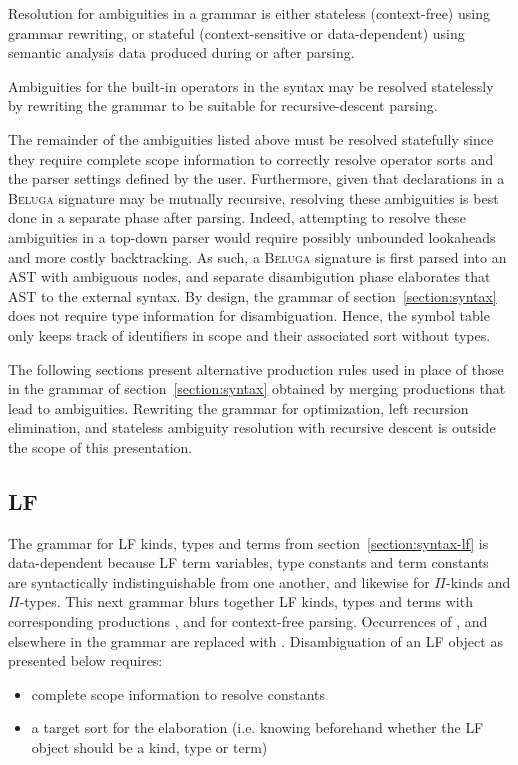 \documentclass[11pt]{article}
\newcommand{\Beluga}{\textsc{Beluga}\xspace}
\newcommand{\LF}{\textsc{LF}\xspace}
\begin{document}
Resolution for ambiguities in a grammar is either stateless (context-free) using grammar rewriting, or stateful (context-sensitive or data-dependent) using semantic analysis data produced during or after parsing.

Ambiguities for the built-in operators in the syntax may be resolved statelessly by rewriting the grammar to be suitable for recursive-descent parsing.

The remainder of the ambiguities listed above must be resolved statefully since they require complete scope information to correctly resolve operator sorts and the parser settings defined by the user.
Furthermore, given that declarations in a \Beluga signature may be mutually recursive, resolving these ambiguities is best done in a separate phase after parsing.
Indeed, attempting to resolve these ambiguities in a top-down parser would require possibly unbounded lookaheads and more costly backtracking.
As such, a \Beluga signature is first parsed into an \ac{AST} with ambiguous nodes, and separate disambigution phase elaborates that \ac{AST} to the external syntax.
By design, the grammar of section~\ref{section:syntax} does not require type information for disambiguation.
Hence, the symbol table only keeps track of identifiers in scope and their associated sort without types.

The following sections present alternative production rules used in place of those in the grammar of section~\ref{section:syntax} obtained by merging productions that lead to ambiguities.
Rewriting the grammar for optimization, left recursion elimination, and stateless ambiguity resolution with recursive descent is outside the scope of this presentation.

\subsection{\LF}

The grammar for \LF kinds, types and terms from section~\ref{section:syntax-lf} is data-dependent because \LF term variables, type constants and term constants are syntactically indistinguishable from one another, and likewise for $ \Pi $-kinds and $ \Pi $-types.
This next grammar blurs together \LF kinds, types and terms with corresponding productions ,  and  for context-free parsing.
Occurrences of ,  and  elsewhere in the grammar are replaced with .
Disambiguation of an \LF object as presented below requires:
\begin{itemize}
\item complete scope information to resolve constants
\item a target sort for the elaboration (i.e. knowing beforehand whether the \LF object should be a kind, type or term)
\end{itemize}
\end{document}
